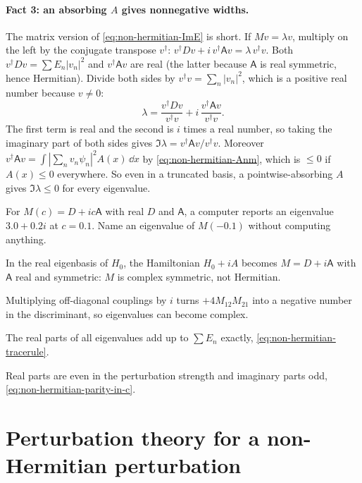 \paragraph{Fact 3: an absorbing $A$ gives nonnegative widths.} The matrix version of \eqref{eq:non-hermitian-ImE} is short. If $Mv=\lambda v$, multiply on the left by the conjugate transpose $v^\dagger$: $v^\dagger D v + i\,v^\dagger\mathsf Av = \lambda\,v^\dagger v$. Both $v^\dagger Dv=\sum E_n|v_n|^2$ and $v^\dagger\mathsf Av$ are real (the latter because $\mathsf A$ is real symmetric, hence Hermitian). Divide both sides by $v^\dagger v=\sum_n|v_n|^2$, which is a positive real number because $v\ne0$:
\[
\lambda = \frac{v^\dagger Dv}{v^\dagger v} + i\,\frac{v^\dagger\mathsf Av}{v^\dagger v}.
\]
The first term is real and the second is $i$ times a real number, so taking the imaginary part of both sides gives $\Im\lambda = v^\dagger\mathsf A v/v^\dagger v$. Moreover $v^\dagger\mathsf Av=\int|\sum_n v_n\psi_n|^2A(x)\,\dd x$ by \eqref{eq:non-hermitian-Anm}, which is $\le0$ if $A(x)\le0$ everywhere. So even in a truncated basis, a pointwise-absorbing $A$ gives $\Im\lambda\le0$ for every eigenvalue.

\begin{checkpoint}
For $M(c)=D+ic\mathsf A$ with real $D$ and $\mathsf A$, a computer reports an eigenvalue $3.0+0.2i$ at $c=0.1$. Name an eigenvalue of $M(-0.1)$ without computing anything.
\end{checkpoint}

\begin{keyideas}
\item In the real eigenbasis of $H_0$, the Hamiltonian $H_0+iA$ becomes $M=D+i\mathsf A$ with $\mathsf A$ real and symmetric: $M$ is complex symmetric, not Hermitian.
\item Multiplying off-diagonal couplings by $i$ turns $+4M_{12}M_{21}$ into a negative number in the discriminant, so eigenvalues can become complex.
\item The real parts of all eigenvalues add up to $\sum E_n$ exactly, \eqref{eq:non-hermitian-tracerule}.
\item Real parts are even in the perturbation strength and imaginary parts odd, \eqref{eq:non-hermitian-parity-in-c}.
\end{keyideas}

\section{Perturbation theory for a non-Hermitian perturbation}\label{sec:non-hermitian-perturb}

